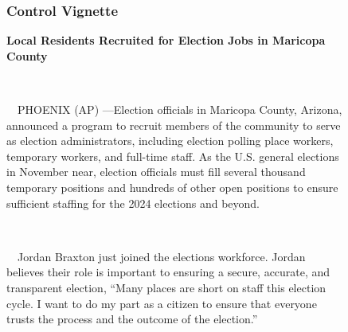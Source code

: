 \documentclass[
  12pt,
  letterpaper,
]{article}
\begin{document}
\begin{figure}
\begin{minipage}{0.45\linewidth}
\subsubsection{Control Vignette}\label{control-vignette-1}

\textbf{Local Residents Recruited for Election Jobs in Maricopa
County}\\
\strut \\
\strut ~~PHOENIX (AP) ---Election officials in Maricopa County, Arizona,
announced a program to recruit members of the community to serve as
election administrators, including election polling place workers,
temporary workers, and full-time staff. As the U.S. general elections in
November near, election officials must fill several thousand temporary
positions and hundreds of other open positions to ensure sufficient
staffing for the 2024 elections and beyond.\\
\strut \\
\strut ~~Jordan Braxton just joined the elections workforce. Jordan
believes their role is important to ensuring a secure, accurate, and
transparent election, ``Many places are short on staff this election
cycle. I want to do my part as a citizen to ensure that everyone trusts
the process and the outcome of the election.''

\end{minipage}%

\end{figure}%

\newpage{}
\end{document}
